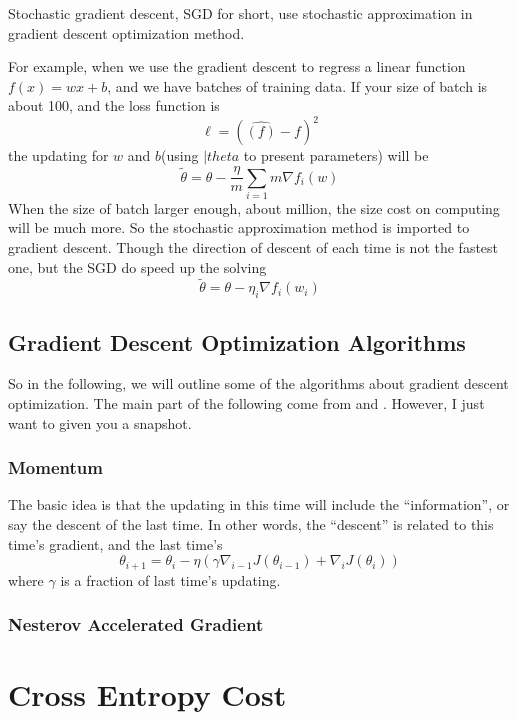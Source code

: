 \documentclass{article}
\begin{document}
Stochastic gradient descent, SGD for short, use stochastic approximation in gradient descent optimization method.

For example, when we use the gradient descent to regress a linear function $f(x) = wx+b$, and we have batches of training data.
If your size of batch is about 100, and the loss function is
\[
\ell = (\hat{(f)} - f)^2
\]
the updating for $w$ and $b$(using $|theta$ to present parameters) will be
\[
\tilde{\theta} = \theta - \frac{\eta}{m}\sum\limits_{i=1}{m}\nabla f_i(w)
\]
When the size of batch larger enough, about million, the size cost on computing will be much more.
So the stochastic approximation method is imported to gradient descent. Though the direction of descent of each time is not
the fastest one, but the SGD do speed up the solving
\[
\tilde{\theta} = \theta - \eta _i\nabla f_i(w_i)
\]

\subsection{Gradient Descent Optimization Algorithms}
\label{sec:gd:gdoa}

So in the following, we will outline some of the algorithms about gradient descent optimization. The main part of the following come from
\cite{DBLP:journals/corr/Ruder16} and \cite{wikipedia:sgd}. However, I just want to given you a snapshot.

\subsubsection{Momentum}
\label{sec:gd:gdoa:momentum}

The basic idea is that the updating in this time will include the ``information'', or say the descent of the last time.
In other words, the ``descent'' is related to this time's gradient, and the last time's
\[
\theta_{i+1} = \theta_i - \eta\left(\gamma\nabla_{i-1}J(\theta_{i-1}) + \nabla_iJ(\theta_i)\right)
\]
where $\gamma$ is a fraction of last time's updating.

\subsubsection{Nesterov Accelerated Gradient}
\label{sec:gd:gdoa:nag}


\section{Cross Entropy Cost}
\label{sec:cec}
\end{document}
